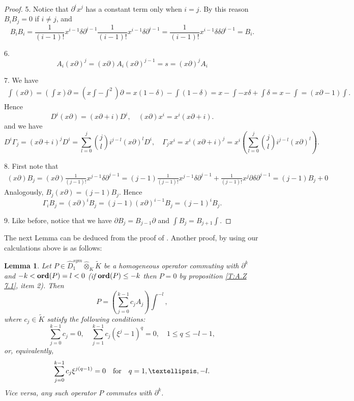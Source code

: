 \documentclass[11pt]{article}
\theoremstyle{definition}
\newcommand{\Ord}{\mathop {\rm \bf ord}}
\theoremstyle{plain}
\newtheorem{lemma}{Lemma}[section]
\numberwithin{equation}{section}
\begin{document}
\begin{proof}
	5. Notice that $\partial^i x^j$ has a constant term  only when $i=j$. By this reason $B_iB_j=0$ if $i\neq j$, and 
$$
	B_iB_i=\frac{1}{(i-1)!}x^{i-1}\delta \partial^{i-1}\frac{1}{(i-1)!}x^{i-1}\delta \partial^{i-1}=\frac{1}{(i-1)!}x^{i-1}\delta\delta \partial^{i-1}=B_i .
$$
	
	6. $$
		A_i (x\partial)^j=(x\partial)A_i(x\partial)^{j-1}=s=(x\partial)^jA_i
		$$
	
	7. We have 
	\begin{multline*}
	\int(x\partial)=(\int x)\partial=(x\int-\int^2)\partial=x(1-\delta)-\int(1-\delta)
	=x-\int -x\delta+\int\delta=x-\int=(x\partial-1)\int .
	\end{multline*}
	Hence $$
		D^i(x\partial)=(x\partial+i)D^i, \quad (x\partial)x^i=x^i(x\partial+i). 
		$$
		and we have
		$$
		D^i\Gamma_j=(x\partial+i)^jD^i=\sum_{l=0}^{j}\binom{j}{l}i^{j-l}(x\partial)^lD^i, \quad \Gamma_jx^i=x^i(x\partial+i)^j=x^i(\sum_{l=0}^{j}\binom{j}{l}i^{j-l}(x\partial)^l).
		$$
	
	8. First note that
\begin{multline*}
	(x\partial)B_j=(x\partial)\frac{1}{(j-1)!}x^{j-1}\delta\partial^{j-1}
	=(j-1)\frac{1}{(j-1)!}x^{j-1}\delta\partial^{j-1}+\frac{1}{(j-1)!}x^{j}\partial\delta\partial^{j-1}
	=(j-1)B_j+0
\end{multline*}
	Analogously, $B_j(x\partial)=(j-1)B_j$. Hence 
	$$
		\Gamma_iB_j=(x\partial)^iB_j=(j-1)(x\partial)^{i-1}B_j=(j-1)^iB_j .
	$$
	
	9. Like before, notice that we have 
	$
	\partial B_j=B_{j-1}\partial 
	$
	and 
	$
	\int B_j=B_{j+1}\int .
	$
\end{proof}


The next Lemma can be deduced from the proof of \cite[Prop.7.1]{A.Z}. Another proof, by using our calculations above is as follows:

\begin{lemma}
	\label{L:homog_comm}
	Let $P\in \hat{D}_1^{sym}\hat{\otimes}_K\tilde{K}$ be a homogeneous operator commuting with $\partial^k$ and $-k<\Ord (P)=l<0$ (if $\Ord (P)\le -k$ then $P=0$ by proposition \ref{T:A.Z 7.1}, item 2). Then 
	$$
	P=(\sum_{j=0}^{k-1}c_jA_j)\int^{-l},
	$$
	where $c_j\in \tilde{K}$ satisfy the following conditions:
	$$
	\sum_{j=0}^{k-1}c_j=0, \quad \sum_{j=1}^{k-1}c_j (\xi^j-1)^q=0, \quad 1\le q\le -l-1,
	$$
	or, equivalently, 
	$$
	\sum_{j=0}^{k-1}c_j\xi^{j(q-1)}=0 \quad \mbox{for\quad } q=1, \ldots , -l.
	$$
	Vice versa, any such operator $P$ commutes with $\partial^k$.
\end{lemma}
\end{document}
